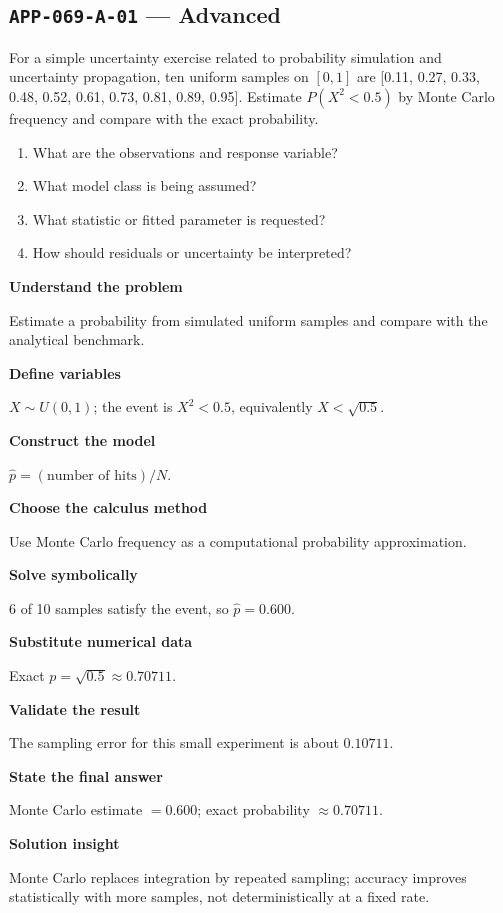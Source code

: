 \documentclass[11pt]{book}
\newcommand{\pid}[1]{\texttt{#1}}
\begin{document}
\subsection*{\pid{APP-069-A-01} — Advanced}
\begin{problembox}
For a simple uncertainty exercise related to probability simulation and uncertainty propagation, ten uniform samples on $[0,1]$ are [0.11, 0.27, 0.33, 0.48, 0.52, 0.61, 0.73, 0.81, 0.89, 0.95]. Estimate $P(X^2<0.5)$ by Monte Carlo frequency and compare with the exact probability.
\end{problembox}
\begin{promptbox}\begin{enumerate}
\item What are the observations and response variable?
\item What model class is being assumed?
\item What statistic or fitted parameter is requested?
\item How should residuals or uncertainty be interpreted?
\end{enumerate}\end{promptbox}
\begin{solutionbox}
\textbf{Understand the problem}\par Estimate a probability from simulated uniform samples and compare with the analytical benchmark.\par\medskip
\textbf{Define variables}\par $X\sim U(0,1)$; the event is $X^2<0.5$, equivalently $X<\sqrt{0.5}$.\par\medskip
\textbf{Construct the model}\par $\widehat p=(\text{number of hits})/N$.\par\medskip
\textbf{Choose the calculus method}\par Use Monte Carlo frequency as a computational probability approximation.\par\medskip
\textbf{Solve symbolically}\par 6 of 10 samples satisfy the event, so $\widehat p=0.600$.\par\medskip
\textbf{Substitute numerical data}\par Exact $p=\sqrt{0.5}\approx 0.70711$.\par\medskip
\textbf{Validate the result}\par The sampling error for this small experiment is about $0.10711$.\par\medskip
\textbf{State the final answer}\par Monte Carlo estimate $=0.600$; exact probability $\approx 0.70711$.\par\medskip
\textbf{Solution insight}\par Monte Carlo replaces integration by repeated sampling; accuracy improves statistically with more samples, not deterministically at a fixed rate.\par\medskip
\end{solutionbox}
\end{document}
